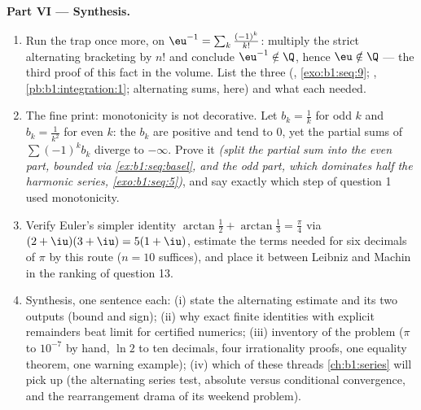 \begin{problem}
\medskip
\noindent\textbf{Part VI --- Synthesis.}
\begin{enumerate}[resume]
  \item Run the trap once more, on $\eu^{-1} = \sum_k
        \frac{(-1)^k}{k!}$: multiply the strict alternating
        bracketing by $n!$ and conclude $\eu^{-1} \notin \Q$,
        hence $\eu \notin \Q$ --- the third proof of this fact
        in the volume. List the three (,
        \cref{exo:b1:seq:9}; ,
        \cref{pb:b1:integration:1}; alternating sums, here) and
        what each needed.
  \item The fine print: monotonicity is not decorative. Let
        $b_k = \frac1k$ for odd $k$ and $b_k = \frac{1}{k^2}$
        for even $k$: the $b_k$ are positive and tend to $0$,
        yet the partial sums of $\sum (-1)^k b_k$ diverge to
        $-\infty$. Prove it \emph{(split the partial sum into
        the even part, bounded via
        \cref{ex:b1:seq:basel}, and the odd part, which
        dominates half the harmonic series,
        \cref{exo:b1:seq:5})}, and say exactly which step of
        question 1 used monotonicity.
  \item Verify Euler's simpler identity $\arctan\frac12 +
        \arctan\frac13 = \frac\pi4$ via $(2 + \iu)(3 + \iu) =
        5(1 + \iu)$, estimate the terms needed for six decimals
        of $\pi$ by this route ($n = 10$ suffices), and place it
        between Leibniz and Machin in the ranking of question
        13.
  \item Synthesis, one sentence each: (i) state the alternating
        estimate and its two outputs (bound and sign); (ii) why
        exact finite identities with explicit remainders beat
        limit  for certified numerics; (iii) inventory
        of the problem ($\pi$ to $10^{-7}$ by hand, $\ln 2$ to
        ten decimals, four irrationality proofs, one equality
        theorem, one warning example); (iv) which of these
        threads \cref{ch:b1:series} will pick up (the alternating
        series test, absolute versus conditional convergence,
        and the rearrangement drama of its weekend problem).
\end{enumerate}
\end{problem}
